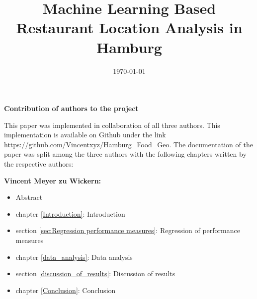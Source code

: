 \documentclass[a4paper, 11pt, oneside]{Thesis}  %
\begin{document}
\frontmatter      %

\title{Machine Learning Based Restaurant Location Analysis in Hamburg}

            
            
\addresses  {\groupname\\\deptname\\\univname}  %
\date       {\today}
\subject    {}
\keywords   {}

\maketitle


\fancyhead{}  %
\rhead{\thepage}  %
\lhead{}  %

\pagestyle{fancy}  %



\textbf{Contribution of authors to the project}

This paper was implemented in collaboration of all three authors. This implementation is available on Github under the link https://github.com/Vincentxyz/Hamburg\_Food\_Geo. The documentation of the paper was split among the three authors with the following chapters written by the respective authors:

\textbf{Vincent Meyer zu Wickern:}
\begin{itemize}
\item Abstract
\item chapter \ref{Introduction}: Introduction
\item section \ref{sec:Regression performance measures}: Regression of performance measures
\item chapter \ref{data_analysis}: Data analysis
\item section \ref{discussion_of_results}: Discussion of results
\item chapter \ref{Conclusion}: Conclusion
\end{itemize}
\end{document}
